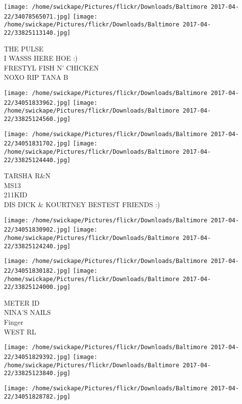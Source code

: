 \documentclass[10pt,letterpaper]{article}
\begin{document}
\texttt{[image: /home/swickape/Pictures/flickr/Downloads/Baltimore 2017-04-22/34078565071.jpg]}
\texttt{[image: /home/swickape/Pictures/flickr/Downloads/Baltimore 2017-04-22/33825113140.jpg]}

THE PULSE\\
I WASSS HERE HOE :)\\
FRESTYL FISH N' CHICKEN\\
NOXO RIP TANA B\\
\pagebreak

\texttt{[image: /home/swickape/Pictures/flickr/Downloads/Baltimore 2017-04-22/34051833962.jpg]}
\texttt{[image: /home/swickape/Pictures/flickr/Downloads/Baltimore 2017-04-22/33825124560.jpg]}

\texttt{[image: /home/swickape/Pictures/flickr/Downloads/Baltimore 2017-04-22/34051831702.jpg]}
\texttt{[image: /home/swickape/Pictures/flickr/Downloads/Baltimore 2017-04-22/33825124440.jpg]}

TARSHA R\&N\\
MS13\\
211KID\\
DIS DICK \& KOURTNEY BESTEST FRIENDS :)\\
\pagebreak

\texttt{[image: /home/swickape/Pictures/flickr/Downloads/Baltimore 2017-04-22/34051830902.jpg]}
\texttt{[image: /home/swickape/Pictures/flickr/Downloads/Baltimore 2017-04-22/33825124240.jpg]}

\texttt{[image: /home/swickape/Pictures/flickr/Downloads/Baltimore 2017-04-22/34051830182.jpg]}
\texttt{[image: /home/swickape/Pictures/flickr/Downloads/Baltimore 2017-04-22/33825124000.jpg]}

METER ID\\
NINA'S NAILS\\
Finger\\
WEST RL\\
\pagebreak

\texttt{[image: /home/swickape/Pictures/flickr/Downloads/Baltimore 2017-04-22/34051829392.jpg]}
\texttt{[image: /home/swickape/Pictures/flickr/Downloads/Baltimore 2017-04-22/33825123840.jpg]}

\vspace{0.25in}
\texttt{[image: /home/swickape/Pictures/flickr/Downloads/Baltimore 2017-04-22/34051828782.jpg]}
\end{document}
